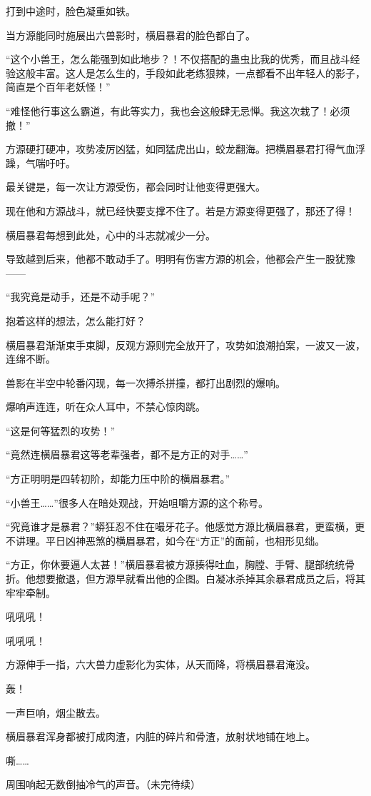 \begin{this_body}
打到中途时，脸色凝重如铁。

当方源能同时施展出六兽影时，横眉暴君的脸色都白了。

“这个小兽王，怎么能强到如此地步？！不仅搭配的蛊虫比我的优秀，而且战斗经验这般丰富。这人是怎么生的，手段如此老练狠辣，一点都看不出年轻人的影子，简直是个百年老妖怪！”

“难怪他行事这么霸道，有此等实力，我也会这般肆无忌惮。我这次栽了！必须撤！”

方源硬打硬冲，攻势凌厉凶猛，如同猛虎出山，蛟龙翻海。把横眉暴君打得气血浮躁，气喘吁吁。

最关键是，每一次让方源受伤，都会同时让他变得更强大。

现在他和方源战斗，就已经快要支撑不住了。若是方源变得更强了，那还了得！

横眉暴君每想到此处，心中的斗志就减少一分。

导致越到后来，他都不敢动手了。明明有伤害方源的机会，他都会产生一股犹豫——

“我究竟是动手，还是不动手呢？”

抱着这样的想法，怎么能打好？

横眉暴君渐渐束手束脚，反观方源则完全放开了，攻势如浪潮拍案，一波又一波，连绵不断。

兽影在半空中轮番闪现，每一次搏杀拼撞，都打出剧烈的爆响。

爆响声连连，听在众人耳中，不禁心惊肉跳。

“这是何等猛烈的攻势！”

“竟然连横眉暴君这等老辈强者，都不是方正的对手……”

“方正明明是四转初阶，却能力压中阶的横眉暴君。”

“小兽王……”很多人在暗处观战，开始咀嚼方源的这个称号。

“究竟谁才是暴君？”蟒狂忍不住在嘬牙花子。他感觉方源比横眉暴君，更蛮横，更不讲理。平日凶神恶煞的横眉暴君，如今在“方正”的面前，也相形见绌。

“方正，你休要逼人太甚！”横眉暴君被方源揍得吐血，胸膛、手臂、腿部统统骨折。他想要撤退，但方源早就看出他的企图。白凝冰杀掉其余暴君成员之后，将其牢牢牵制。

吼吼吼！

吼吼吼！

方源伸手一指，六大兽力虚影化为实体，从天而降，将横眉暴君淹没。

轰！

一声巨响，烟尘散去。

横眉暴君浑身都被打成肉渣，内脏的碎片和骨渣，放射状地铺在地上。

嘶……

周围响起无数倒抽冷气的声音。（未完待续）

\end{this_body}

